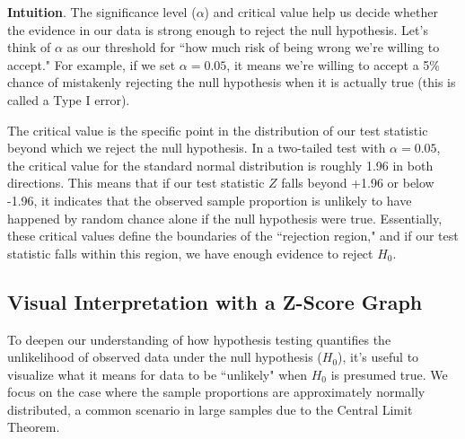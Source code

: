\documentclass[11pt]{article}
\begin{document}
\textbf{Intuition}. The significance level (\( \alpha \)) and critical value help us decide whether the evidence in our data is strong enough to reject the null hypothesis. Let's think of \( \alpha \) as our threshold for ``how much risk of being wrong we're willing to accept." For example, if we set \( \alpha = 0.05 \), it means we're willing to accept a 5\% chance of mistakenly rejecting the null hypothesis when it is actually true (this is called a Type I error). 

The critical value is the specific point in the distribution of our test statistic beyond which we reject the null hypothesis. In a two-tailed test with \( \alpha = 0.05 \), the critical value for the standard normal distribution is roughly 1.96 in both directions. This means that if our test statistic \( Z \) falls beyond +1.96 or below -1.96, it indicates that the observed sample proportion is unlikely to have happened by random chance alone if the null hypothesis were true. Essentially, these critical values define the boundaries of the ``rejection region," and if our test statistic falls within this region, we have enough evidence to reject \( H_0 \).

\subsection*{Visual Interpretation with a Z-Score Graph}

To deepen our understanding of how hypothesis testing quantifies the unlikelihood of observed data under the null hypothesis (\( H_0 \)), it's useful to visualize what it means for data to be ``unlikely" when \( H_0 \) is presumed true. We focus on the case where the sample proportions are approximately normally distributed, a common scenario in large samples due to the Central Limit Theorem.
\end{document}
